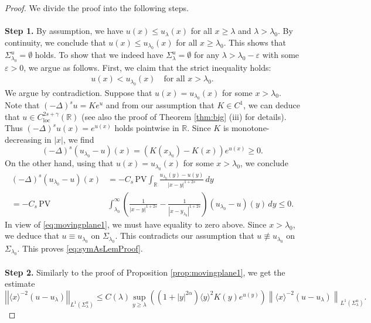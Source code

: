\documentclass[reqno,10pt,a4paper]{amsart}
\theoremstyle{definition}
\theoremstyle{definition}
\theoremstyle{remark}
\theoremstyle{remark}
\numberwithin{equation}{section}
\newcommand{\R}{\mathbb{R}}
\newcommand{\be}{\begin{equation}}
\newcommand{\ee}{\end{equation}}
\newcommand{\eps}{\varepsilon}
\newcommand{\Ds}{(-\Delta)^{s}}
\newcommand{\Cloc}{C_{\mathrm{loc}}}
\begin{document}
\begin{appendix}
\begin{proof}
    We divide the proof into the following steps. \\ \\
    \textbf{Step 1.} By assumption, we have $u(x) \leq u_\lambda(x)$ for all $x\geq \lambda$ and $\lambda > \lambda_0$. By continuity, we conclude that $u(x) \leq u_{\lambda_0}(x)$ for all $x\geq \lambda_0$. This shows that $\Sigma_{\lambda_0}^u = \emptyset$ holds. To show that we indeed have $\Sigma_\lambda^u = \emptyset$ for any $\lambda > \lambda_0-\eps$ with some $\eps > 0$, we argue as follows. First, we claim that the strict inequality holds: \begin{align}\label{eq:symAsLemProof}
        u(x) < u_{\lambda_0}(x) \quad \mbox{for all $x > \lambda_0$}.
    \end{align}
 We argue by contradiction. Suppose that $u(x) = u_{\lambda_0}(x)$ for some $x>\lambda_0$. Note that $\Ds u = K e^u$ and from our assumption that $K \in C^1$, we can deduce that $u \in \Cloc^{2s+\gamma}(\R)$ (see also the proof of Theorem \ref{thm:big} (iii) for details). Thus $\Ds u(x) = e^{u(x)}$ holds pointwise in $\R$. Since $K$ is monotone-decreasing in $|x|$, we find 
    \be  \label{eq:movingplane1}
        (-\Delta)^s (u_{\lambda_0}-u)(x) = (K(x_{\lambda_0}) - K(x)) e^{u(x)} \geq 0.
    \ee
    On the other hand, using that $u(x) = u_{\lambda_0}(x)$ for some $x > \lambda_0$, we conclude 
    \begin{align*}
        (-\Delta)^s(u_{\lambda_0}-u)(x)  &= -C_s \, \mathrm{PV} \int_\mathbb{R} \frac{u_{\lambda_0}(y)-u(y)}{|x-y|^{1+2s}} \, dy \\
        = -C_s \, \mathrm{PV} &\int_{\lambda_0}^\infty \left(\frac{1}{|x-y|^{1+2s}} - \frac{1}{|x-y_{\lambda_0}|^{1+2s}}\right)(u_{\lambda_0}-u)(y) \, dy \leq 0.
    \end{align*}
    In view of \eqref{eq:movingplane1}, we must have equality to zero above. Since $x>\lambda_0$, we deduce that $u \equiv u_{\lambda_0}$ on $\Sigma_{\lambda_0}$. This contradicts our assumption that $u \not \equiv u_{\lambda_0}$ on $\Sigma_{\lambda_0}$. This proves  \eqref{eq:symAsLemProof}. \\ \\
    \textbf{Step 2.} Similarly to the proof of Proposition \ref{prop:movingplane1}, we get the estimate 
    $$
        \left|\left|\langle x\rangle^{-2}(u-u_\lambda)\right|\right|_{L^1(\Sigma_\lambda^u)}\leq C(\lambda) \sup_{y\geq \lambda} \left(\left(1 + |y|^{2\alpha }\right) \langle y\rangle^2 K(y) e^{u(y)}\right) \left \| \langle x\rangle^{-2}(u-u_\lambda)\right \|_{L^1(\Sigma_\lambda^u)}.
$$
\end{proof}
\end{appendix}
\end{document}
